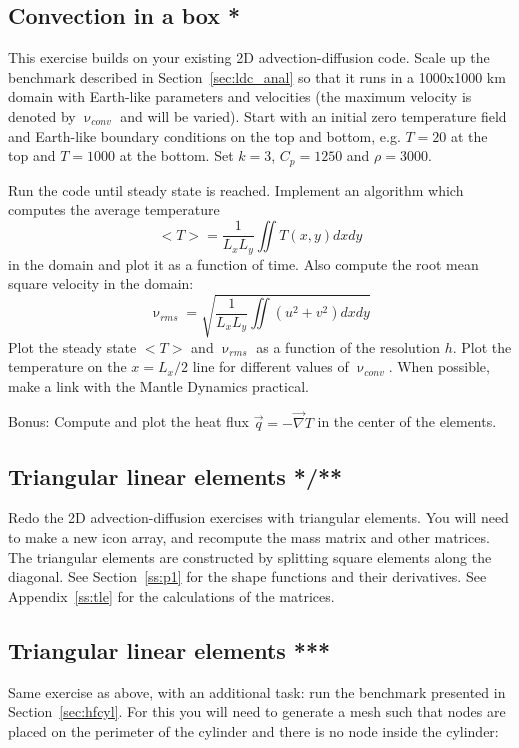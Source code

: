 

\subsection{Convection in a box *}

This exercise builds on your existing 2D advection-diffusion code. 
Scale up the benchmark described in Section~\ref{sec:ldc_anal} so that 
it runs in a 1000x1000 km domain with Earth-like parameters and velocities
(the maximum velocity is denoted by $\upnu_{conv}$ and will be varied).
Start with an initial zero temperature field and Earth-like boundary conditions 
on the top and bottom, e.g. $T=20$ at the top and $T=1000$ at the bottom. 
Set $k=3$, $C_p=1250$ and $\rho=3000$.

Run the code until steady state is reached. Implement an algorithm which computes the average 
temperature 
\[
<T> = \frac{1}{L_xL_y} \iint T(x,y) dx dy
\]
in the domain and plot it as a function of time.
Also compute the root mean square velocity in the domain:
\[
\upnu_{rms} = \sqrt{   \frac{1}{L_xL_y} \iint (u^2+v^2) dx dy  }
\]
Plot the steady state $<T>$ and $\upnu_{rms} $ as a function of the resolution $h$. 
Plot the temperature on the $x=L_x/2$ line for different values 
of $\upnu_{conv}$.
When possible, make a link with the Mantle Dynamics practical. 

Bonus: Compute and plot the heat flux $\vec{q}=-\vec\nabla T$ in the center of the elements.

\subsection{Triangular linear elements */**}

Redo the 2D advection-diffusion exercises with triangular elements.
You will need to make a new icon array, and recompute the mass matrix 
and other matrices. The triangular elements are constructed by splitting 
square elements along the diagonal.
See Section~\ref{ss:p1} for the shape functions and their derivatives.
See Appendix~\ref{ss:tle} for the calculations of the matrices.  

\subsection{Triangular linear elements ***}

Same exercise as above, with an additional task: run the benchmark
presented in Section~\ref{sec:hfcyl}.
For this you will need to generate a mesh 
such that nodes are placed on the perimeter of the cylinder and there is 
no node inside the cylinder:

